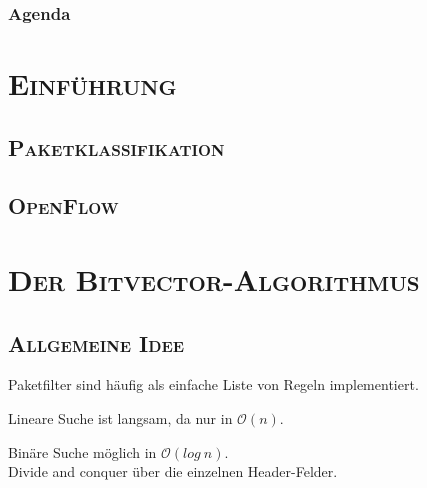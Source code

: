 \documentclass[xcolor=x11names,compress]{beamer}
\renewcommand{\(}{\begin{columns}}
\renewcommand{\)}{\end{columns}}
\newcommand{\<}[1]{\begin{column}{#1}}
\renewcommand{\>}{\end{column}}
\begin{document}

\begin{frame}
  \frametitle{Agenda}
  \tableofcontents
\end{frame}

\section{\scshape Einführung}
\subsection{\scshape Paketklassifikation}
\begin{frame}
  \frametitle{\insertsubsection}
  
\end{frame}
\subsection{\scshape OpenFlow}
\begin{frame}
  \frametitle{\insertsubsection}
  
\end{frame}

\section{\scshape Der Bitvector-Algorithmus}
\subsection{\scshape Allgemeine Idee}
\begin{frame}
  Paketfilter sind häufig als einfache Liste von Regeln implementiert.\\
  \begin{tcolorbox}[colback=red!5!white,colframe=red!75!black,title=Problem,drop fuzzy shadow]
  Lineare Suche ist langsam, da nur in $\mathcal O(n)$.
  \end{tcolorbox}
  \pause
  \begin{tcolorbox}[colback=green!5!white,colframe=green!75!black,title=Mögliche Lösung,drop fuzzy shadow]
  Binäre Suche möglich in $\mathcal O(log\ n)$.\\
  Divide and conquer über die einzelnen Header-Felder.
  \end{tcolorbox}
  \vspace{\baselineskip}
\end{frame}
\end{document}
